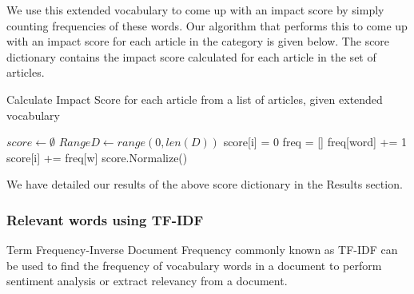 \documentclass{article}
\begin{document}
We use this extended vocabulary to come up with an impact score by simply counting frequencies of these words. Our algorithm that performs this to come up with an impact score for each article in the category is given below. The score dictionary contains the impact score calculated for each article in the set of articles. 

\begin {center}
\begin {algorithm}[ht]
\SetNoFillComment
\caption{Calculate Impact Score for each article from a list of articles, given extended vocabulary}
 {
    $score \gets \emptyset $\;
    $RangeD \gets range(0, len(D)) $\;
     {
    	score[i] = 0 \;
	freq = [] \;
	 {
		freq[word] += 1 \;
	}
	 {
		score[i] += freq[w] \;
	}
    }
    score.Normalize() \;
    \;
}
\end {algorithm}
\end {center}

We have detailed our results of the above score dictionary in the Results section.

\subsubsection {Relevant words using TF-IDF}

Term Frequency-Inverse Document Frequency commonly known as TF-IDF can be used to find the frequency of vocabulary words in a document to perform sentiment analysis or extract relevancy from a document.
\end{document}
